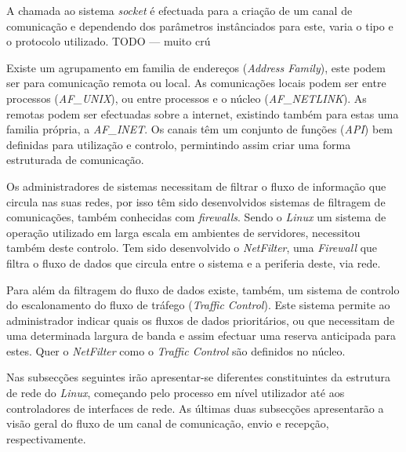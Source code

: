 A chamada ao sistema \textit{socket} é efectuada para a criação de um canal de comunicação e dependendo dos parâmetros instânciados para este, varia o tipo e o protocolo utilizado. TODO --- muito crú

Existe um agrupamento em familia de endereços (\textit{Address Family}), este podem ser para comunicação remota ou local.
As comunicações locais podem ser entre processos (\textit{AF\_UNIX}), ou entre processos e o núcleo (\textit{AF\_NETLINK}).
As remotas podem ser efectuadas sobre a internet, existindo também para estas uma familia própria, a \textit{AF\_INET}.
Os canais têm um conjunto de funções (\textit{API}) bem definidas para utilização e controlo, permintindo assim criar uma forma estruturada de comunicação.

Os administradores de sistemas necessitam de filtrar o fluxo de informação que circula nas suas redes, por isso têm sido desenvolvidos sistemas de filtragem de comunicações, também conhecidas com \textit{firewalls}.
Sendo o \textit{Linux} um sistema de operação utilizado em larga escala em ambientes de servidores, necessitou também deste controlo. Tem sido desenvolvido o \textit{NetFilter}, uma \textit{Firewall} que filtra o fluxo de dados que circula entre o sistema e a periferia deste, via rede.

Para além da filtragem do fluxo de dados existe, também, um sistema de controlo do escalonamento do fluxo de tráfego (\textit{Traffic Control}).
Este sistema permite ao administrador indicar quais os fluxos de dados prioritários, ou que necessitam de uma determinada largura de banda e assim efectuar uma reserva anticipada para estes.
Quer o \textit{NetFilter} como o \textit{Traffic Control} são definidos no núcleo.
 
Nas subsecções seguintes irão apresentar-se diferentes constituintes da estrutura de rede do \textit{Linux}, começando pelo processo em nível utilizador até aos controladores de interfaces de rede. As últimas duas subsecções apresentarão a visão geral do fluxo de um canal de comunicação, envio e recepção, respectivamente.



